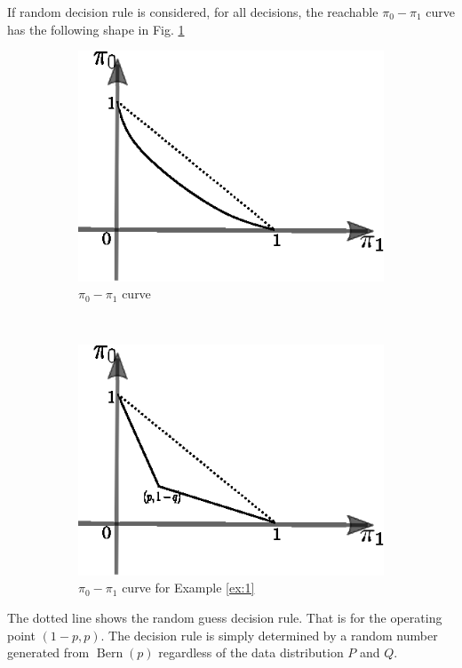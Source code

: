 \documentclass{article}
\DeclareMathOperator{\Bern}{Bern}
\begin{document}
If random decision rule is considered,
for all decisions, the reachable $\pi_0-\pi_1$ curve
has the following shape in Fig. \ref{fig:pi01}
\begin{figure}[!ht]
\begin{subfigure}{0.45\textwidth}
    \centering
    \includegraphics{pi0pi1.eps}
    \caption{$\pi_0-\pi_1$ curve}
    \label{fig:pi01}
\end{subfigure}~
\begin{subfigure}{0.45\textwidth}
    \centering
    \includegraphics{pi0pi1_bern.eps}
    \caption{$\pi_0-\pi_1$ curve for Example \ref{ex:1}}
    \label{fig:pi01_bern}
\end{subfigure}
\caption{}
\end{figure}
The dotted line shows the random guess decision
rule. That is for the operating point $(1-p,p)$.
The decision rule is simply determined by a random number generated from $\Bern(p)$
regardless of the data distribution $P$ and $Q$.
\end{document}
